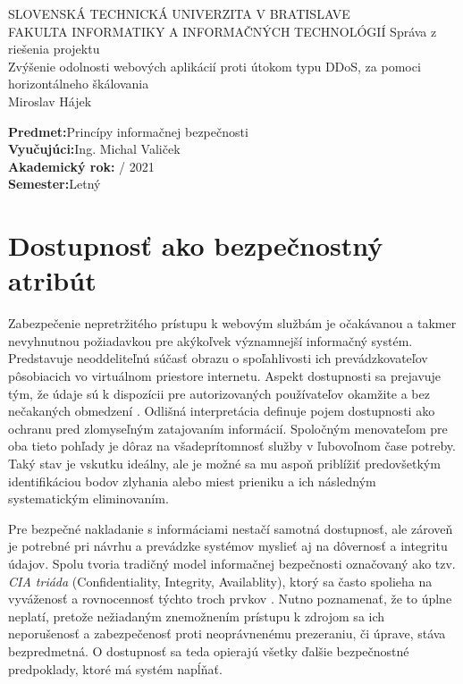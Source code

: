 \documentclass[12pt, a4paper]{article}
\begin{document}
\begin{titlepage}
    \hspace{0pt}
    \centering
    \large SLOVENSKÁ TECHNICKÁ UNIVERZITA V BRATISLAVE \\
    \large FAKULTA INFORMATIKY A INFORMAČNÝCH TECHNOLÓGIÍ
    \vfill
    \large Správa z riešenia projektu \\
    \vspace{1cm}
    \Large Zvýšenie odolnosti webových aplikácií proti útokom typu DDoS, za pomoci horizontálneho škálovania\\
    \vspace{1cm}
    \large Miroslav Hájek
    \vfill
    \normalsize
    \begin{flushleft}
    \textbf{Predmet:}\quad Princípy informačnej bezpečnosti \\
    \textbf{Vyučujúci:}\quad Ing. Michal Valiček \\
	\textbf{Akademický rok:} / 2021 \\
	\textbf{Semester:}\quad Letný
	\end{flushleft}
\end{titlepage}


\tableofcontents
\newpage
{}
\setcounter{page}{1}

\section{Dostupnosť ako bezpečnostný atribút}
Zabezpečenie nepretržitého prístupu k webovým službám je očakávanou a takmer nevyhnutnou požiadavkou pre 
akýkoľvek významnejší informačný systém. Predstavuje neoddeliteľnú súčasť obrazu o spoľahlivosti 
ich prevádzkovateľov pôsobiacich vo virtuálnom priestore internetu. Aspekt dostupnosti sa prejavuje tým,
že údaje sú k dispozícii pre autorizovaných používateľov okamžite a bez nečakaných obmedzení   
 \cite{availability}. Odlišná interpretácia definuje pojem dostupnosti ako ochranu pred zlomyseľným 
zatajovaním informácií. Spoločným menovateľom pre oba tieto pohľady je dôraz na všadeprítomnosť služby v 
ľubovoľnom čase potreby. Taký stav je vskutku ideálny, ale je možné sa mu aspoň priblížiť predovšetkým 
identifikáciou bodov zlyhania alebo miest prieniku a ich následným systematickým eliminovaním.

Pre bezpečné nakladanie s informáciami nestačí samotná dostupnosť, ale zároveň je potrebné pri návrhu a 
prevádzke systémov myslieť aj na dôvernosť a integritu údajov. Spolu tvoria tradičný model informačnej 
bezpečnosti označovaný ako tzv. \emph{CIA triáda} (Confidentiality, Integrity, Availablity), ktorý sa často 
spolieha na vyváženosť a rovnocennosť týchto troch prvkov \cite{availability}. Nutno poznamenať, 
že to úplne neplatí, pretože nežiadaným znemožnením prístupu k zdrojom sa ich neporušenosť a zabezpečenosť 
proti neoprávnenému prezeraniu, či úprave, stáva bezpredmetná. O dostupnosť sa teda opierajú všetky ďalšie
bezpečnostné predpoklady, ktoré má systém napĺňať.
\end{document}
